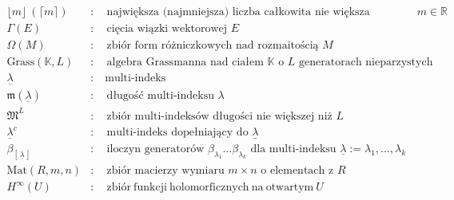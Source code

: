 \documentclass[11pt,a4paper]{report}
\theoremstyle{definition}
\begin{document}
\begin{equation*}
\begin{aligned}
		\lfloor m \rfloor\ (\lceil m \rceil)           & : \quad \textrm{największa (najmniejsza) liczba całkowita nie większa (mniejsza) niż\ } m \in \mathbb{R}                                                   \\
		\Gamma(E)                                      & : \quad \textrm{cięcia wiązki wektorowej }E                                                                                                                  \\
		\Omega(M)                                      & : \quad \textrm{zbiór form różniczkowych nad rozmaitością }M                                                                                              \\
		\mathrm{Grass}(\mathbb{K}, L)                  & : \quad \textrm{algebra Grassmanna nad ciałem } \mathbb{K} \textrm{ o } L \textrm{ generatorach nieparzystych}                                                \\
		\underline \lambda                             & : \quad \textrm{multi-indeks}                                                                                                                                  \\
		\mathfrak{m}(\underline \lambda)               & : \quad \textrm{długość multi-indeksu } \lambda                                                                                                             \\
		\mathfrak{M}^L                                 & : \quad \textrm{zbiór multi-indeksów długości nie większej niż }L                                                                                        \\
		\underline \lambda ^c                          & : \quad \textrm{multi-indeks dopełniający do }\underline \lambda                                                                                             \\
		\beta_{\left[\, \underline{\lambda}\, \right]} & : \quad \textrm{iloczyn generatorów }\beta_{\lambda_1} \ldots \beta_{\lambda_k} \textrm{ dla multi-indeksu }\underline{\lambda} := \lambda_1,\ldots,\lambda_k \\
		\mathrm{Mat}(R,m,n)                            & : \quad \textrm{zbiór macierzy wymiaru } m \times n \textrm{ o elementach z }R                                                                                \\
		H^\infty(U)                                    & : \quad \mathrm{zbiór\ funkcji\ holomorficznych\ na\ otwartym\ } U                                                                                            \\

\end{aligned}
\end{equation*}
\end{document}

